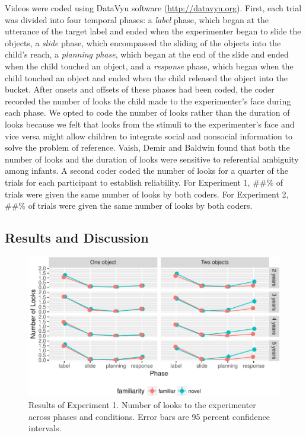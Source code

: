 \documentclass[10pt, letterpaper]{article}
\newenvironment{CodeChunk}{}{}
\begin{document}
Videos were coded using DataVyu software (\url{http://datavyu.org}).
First, each trial was divided into four temporal phases: a \emph{label}
phase, which began at the utterance of the target label and ended when
the experimenter began to slide the objects, a \emph{slide} phase, which
encompassed the sliding of the objects into the child's reach, a
\emph{planning phase}, which began at the end of the slide and ended
when the child touched an object, and a \emph{response} phase, which
began when the child touched an object and ended when the child released
the object into the bucket. After onsets and offsets of these phases had
been coded, the coder recorded the number of looks the child made to the
experimenter's face during each phase. We opted to code the number of
looks rather than the duration of looks because we felt that looks from
the stimuli to the experimenter's face and vice versa might allow
children to integrate social and nonsocial information to solve the
problem of reference. Vaish, Demir and Baldwin found that both the
number of looks and the duration of looks were sensitive to referential
ambiguity among infants. A second coder coded the number of looks for a
quarter of the trials for each participant to establish reliability. For
Experiment 1, \#\#\% of trials were given the same number of looks by
both coders. For Experiment 2, \#\#\% of trials were given the same
number of looks by both coders.

\subsection{Results and Discussion}\label{results-and-discussion}

\begin{CodeChunk}
\begin{figure}[h]

{\centering \includegraphics{figs/results_e1-1} 

}

\caption[Results of Experiment 1]{Results of Experiment 1. Number of looks to the experimenter across phases and conditions. Error bars are 95 percent confidence intervals.}\label{fig:results_e1}
\end{figure}
\end{CodeChunk}
\end{document}
